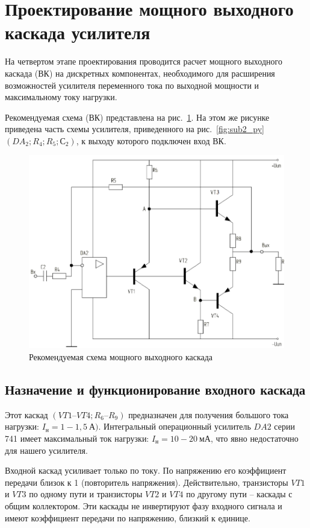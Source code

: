 \section{Проектирование мощного выходного каскада усилителя}

На четвертом этапе проектирования 
проводится расчет мощного выходного каскада (ВК)
на дискретных компонентах, необходимого для
расширения возможностей усилителя переменного тока
по выходной мощности и максимальному току нагрузки.

Рекомендуемая схема (ВК) представлена 
на рис.~\ref{fig:recommendedsheme}. 
На этом же рисунке приведена часть схемы усилителя,
приведенного на рис.~\ref{fig:sub2_py}
$ (DA_2; R_4; R_5; С_2) $, к выходу которого
подключен вход ВК.

\begin{figure}[H]
	\centering
	\includegraphics[width=0.7\linewidth]{photo/recommended_sheme}
	\caption{Рекомендуемая схема мощного выходного каскада}
	\label{fig:recommendedsheme}
\end{figure}

\subsection{Назначение и функционирование входного каскада}

Этот каскад $ (VT1 – VT4; R_6 – R_9) $
предназначен для получения большого 
тока нагрузки: $ I_н = 1 - 1,5~А) $.
Интегральный операционный усилитель $ DA2 $ серии 741
имеет максимальный ток нагрузки: $ I_н = 10 - 20~мА $,
что явно недостаточно для нашего усилителя.

Входной каскад усиливает только по току.
По напряжению его коэффициент передачи
близок к 1 (повторитель напряжения).
Действительно, транзисторы $ VT1 $  и $ VT3 $
по одному пути и транзисторы $ VT2 $  и $ VT4 $
по другому пути – каскады с общим коллектором.
Эти каскады не инвертируют фазу входного сигнала
и имеют коэффициент передачи по напряжению,
близкий к единице.

